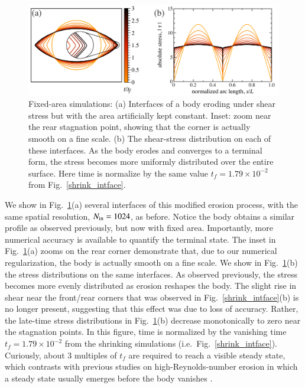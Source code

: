 \documentclass[preprint, 10pt]{elsarticle}
\begin{document}
\begin{figure}%
\begin{center}
\includegraphics[width = 0.85 \textwidth]{./figs/fixed_intface.pdf}
\caption{Fixed-area simulations: (a) Interfaces of a body eroding under shear stress but with the area artificially kept constant. Inset: zoom near the rear stagnation point, showing that the corner is actually smooth on a fine scale. (b) The shear-stress distribution on each of these interfaces. As the body erodes and converges to a terminal form, the stress becomes more uniformly distributed over the entire surface. Here time is normalize by the same value $t_f = 1.79 \times 10^{-2}$ from Fig.~\ref{shrink_intface}.}
\label{fixed_intface}
\end{center}
\end{figure}

	We show in Fig.~\ref{fixed_intface}(a) several interfaces of this modified erosion process, with the same spatial resolution, $N_{\mathrm{in}} = 1024$, as before. Notice the body obtains a similar profile as observed previously, but now with fixed area. Importantly, more numerical accuracy is available to quantify the terminal state. The inset in Fig.~\ref{fixed_intface}(a) zooms on the rear corner demonstrate that, due to our numerical regularization, the body is actually smooth on a fine scale. We show in Fig.~\ref{fixed_intface}(b) the stress distributions on the same interfaces. As observed previously, the stress becomes more evenly distributed as erosion reshapes the body. The slight rise in shear near the front/rear corners that was observed in Fig.~\ref{shrink_intface}(b) is no longer present, suggesting that this effect was due to loss of accuracy. Rather, the late-time stress distributions in Fig.~\ref{fixed_intface}(b) decrease monotonically to zero near the stagnation points. In this figure, time is normalized by the vanishing time $t_f = 1.79 \times 10^{-2}$ from the shrinking simulations (i.e.~Fig.~\ref{shrink_intface}). Curiously, about 3 multiples of $t_f$ are required to reach a visible steady state, which contrasts with previous studies on high-Reynolds-number erosion in which a steady state usually emerges before the body vanishes \cite{moo-ris-chi-zha-she2013}.
\end{document}
